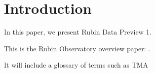 \section{Introduction}

In this paper, we present Rubin Data Preview 1.
\vskip 0.4in


This is the Rubin Observatory overview paper: \citet{2019ApJ...873..111I}.

It will include a glossary of terms such as \gls{TMA}


